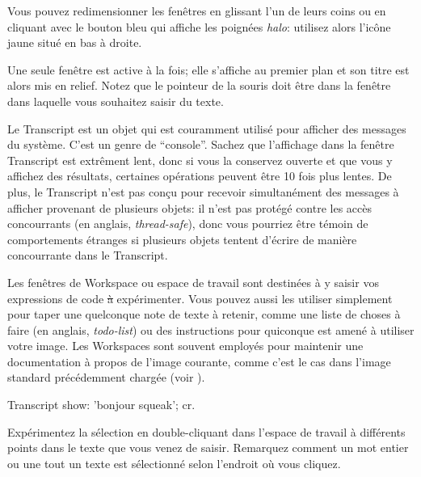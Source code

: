\documentclass[a4paper,10pt,twoside]{book}
\begin{document}
Vous pouvez redimensionner les fenêtres en glissant l'un de leurs
coins ou en cliquant avec le bouton bleu qui affiche les poignées
\emph{halo}: utilisez alors l'icône jaune situé en bas à droite.

Une seule fenêtre est active à la fois; elle s'affiche au premier plan
et son titre est alors mis en relief. Notez que le pointeur de la
souris doit être dans la fenêtre dans laquelle vous souhaitez saisir du texte.

Le Transcript est un objet qui est couramment utilisé pour afficher
des messages du système. C'est un genre de ``console''.
Sachez que l'affichage dans la fenêtre Transcript est extr\^ement
lent, donc si vous la conservez ouverte et que vous y affichez des
résultats, certaines opérations peuvent \^etre 10 fois plus lentes.
De plus, le Transcript n'est pas conçu pour recevoir
simultanément des messages à afficher provenant de plusieurs objets:
il n'est pas prot\'eg\'e contre les acc\`es concourrants (en anglais,
\emph{thread-safe}), donc vous pourriez \^etre t\'emoin de
comportements \'etranges si plusieurs objets tentent d'\'ecrire de
mani\`ere concourrante dans le Transcript. 

Les fen\^etres de Workspace ou espace de travail sont destin\'ees \`a
y saisir vos expressions de code \st \`a exp\'erimenter.
Vous pouvez aussi les utiliser simplement pour taper une quelconque
note de texte \`a retenir, comme une liste de choses \`a faire (en
anglais, \emph{todo-list}) ou des instructions pour quiconque est
amen\'e \`a utiliser votre image.
Les Workspaces sont souvent employ\'es pour maintenir une
documentation \`a propos de l'image courante, comme c'est le cas
dans l'image standard pr\'ec\'edemment charg\'ee (voir
).

\begin{code}{}
Transcript show: 'bonjour squeak'; cr.
\end{code}

Exp\'erimentez la s\'election
en double-cliquant dans l'espace de travail \`a diff\'erents points dans
le texte que vous venez de saisir.
Remarquez comment un mot entier ou une tout un texte est
s\'electionn\'e selon l'endroit o\`u vous cliquez.
\end{document}
